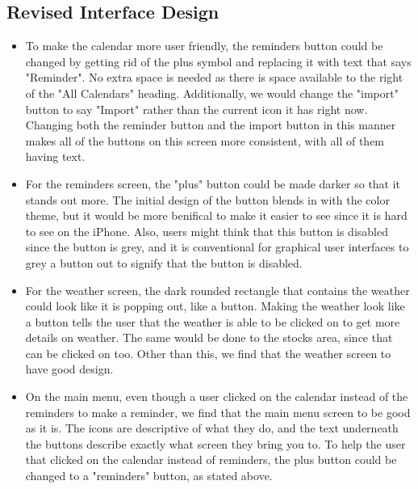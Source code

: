 \subsection{Revised Interface Design}
\begin{itemize}
    \item To make the calendar more user friendly, the reminders button could be changed by getting rid of the plus symbol and replacing it with text that says "Reminder". No extra space is needed as there is space available to the right of the "All Calendars" heading. Additionally, we would change the "import" button to say "Import" rather than the current icon it has right now. Changing both the reminder button and the import button in this manner makes all of the buttons on this screen more consistent, with all of them having text.
    \item For the reminders screen, the "plus" button could be made darker so that it stands out more. The initial design of the button blends in with the color theme, but it would be more benifical to make it easier to see since it is hard to see on the iPhone. Also, users might think that this button is disabled since the button is grey, and it is conventional for graphical user interfaces to grey a button out to signify that the button is disabled.
    \item For the weather screen, the dark rounded rectangle that contains the weather could look like it is popping out, like a button. Making the weather look like a button tells the user that the weather is able to be clicked on to get more details on weather. The same would be done to the stocks area, since that can be clicked on too. Other than this, we find that the weather screen to have good design.
    \item On the main menu, even though a user clicked on the calendar instead of the reminders to make a reminder, we find that the main menu screen to be good as it is. The icons are descriptive of what they do, and the text underneath the buttons describe exactly what screen they bring you to. To help the user that clicked on the calendar instead of reminders, the plus button could be changed to a "reminders" button, as stated above.
\end{itemize}
